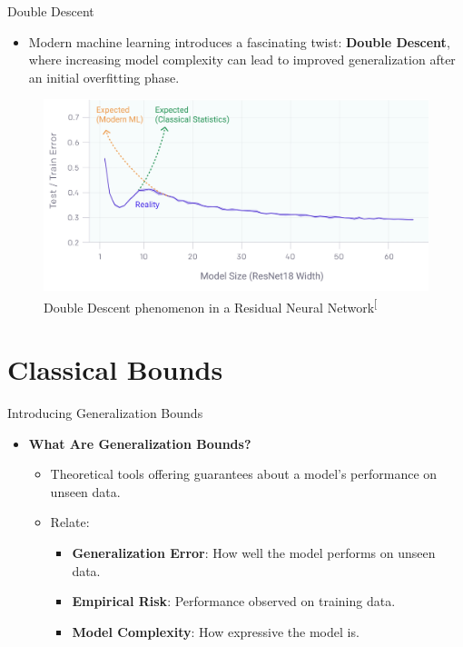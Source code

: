 \documentclass[
  ignorenonframetext,
]{beamer}
\providecommand{\tightlist}{%
  \setlength{\itemsep}{0pt}\setlength{\parskip}{0pt}}\usepackage{longtable,booktabs,array}
\begin{document}
\begin{frame}{Double Descent}
\label{double-descent}
\begin{itemize}
\tightlist
\item
  Modern machine learning introduces a fascinating twist: \textbf{Double
  Descent}, where increasing model complexity can lead to improved
  generalization after an initial overfitting phase.
\end{itemize}

\begin{figure}[H]

{\centering \includegraphics[width=0.8\linewidth,height=\textheight,keepaspectratio]{extra/double_descent.png}

}

\caption{Double Descent phenomenon in a Residual Neural
Network\textsuperscript{{[}\citeproc{ref-nakkiran19}{2}{]}}}

\end{figure}%
\end{frame}

\section{Classical Bounds}\label{classical-bounds}

\begin{frame}{Introducing Generalization Bounds}
\label{introducing-generalization-bounds}
\begin{itemize}
\tightlist
\item
  \textbf{What Are Generalization Bounds?}

  \begin{itemize}
  \tightlist
  \item
    Theoretical tools offering guarantees about a model's performance on
    unseen data.
  \item
    Relate:

    \begin{itemize}
    \tightlist
    \item
      \textbf{Generalization Error}: How well the model performs on
      unseen data.
    \item
      \textbf{Empirical Risk}: Performance observed on training data.
    \item
      \textbf{Model Complexity}: How expressive the model is.
    \end{itemize}
  \end{itemize}
\end{itemize}
\end{frame}
\end{document}
